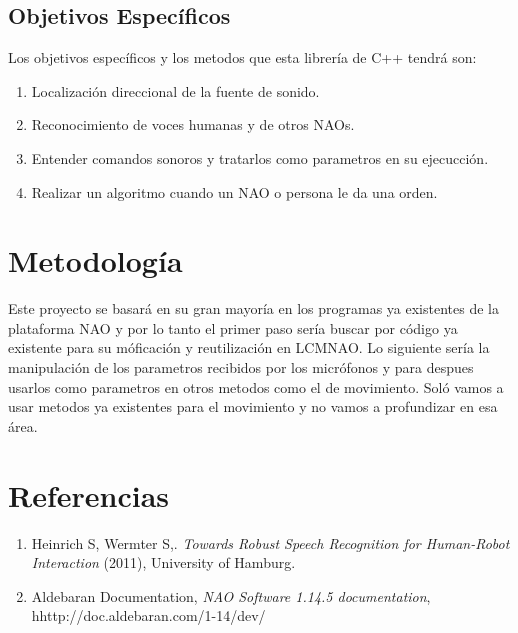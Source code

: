 \documentclass[letterpaper]{article}
\begin{document}
\subsection{Objetivos Específicos}

Los objetivos específicos y los metodos que esta librería de C++ tendrá son:\\

\begin{enumerate}
\item Localización direccional de la fuente de sonido.
\item Reconocimiento de voces humanas y de otros NAOs.
\item Entender comandos sonoros y tratarlos como parametros en su ejecucción.
\item Realizar un algoritmo cuando un NAO o persona le da una orden.
\end{enumerate}

\section{Metodología}

Este proyecto se basará en su gran mayoría en los programas ya existentes de la plataforma NAO y por lo tanto el primer paso sería buscar por código ya existente para su móficación y reutilización en LCMNAO. Lo siguiente sería la manipulación de los parametros recibidos por los micrófonos y para despues usarlos como parametros en otros metodos como el de movimiento. Soló vamos a usar metodos ya existentes para el movimiento y no vamos a profundizar en esa área.



\section{Referencias}

\begin{enumerate}
\item Heinrich S, Wermter S,. \textit{Towards Robust Speech Recognition for Human-Robot Interaction} (2011), University of Hamburg.
\item Aldebaran Documentation, \textit{NAO Software 1.14.5 documentation}, hhttp://doc.aldebaran.com/1-14/dev/

\end{enumerate}
	
\end{document}
